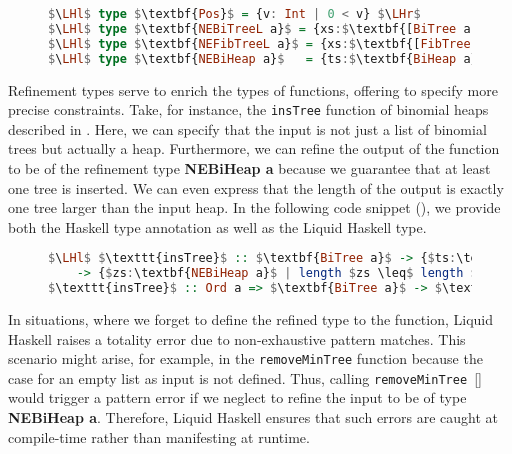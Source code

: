 \documentclass{clmthesis}
\begin{document}
\begin{figure}[h]
\begin{lstlisting}[mathescape=true, language=haskell, caption={Refinement types.},captionpos=b, label=fig:reftypes]
$\LHl$ type $\textbf{Pos}$ = {v: Int | 0 < v} $\LHr$
$\LHl$ type $\textbf{NEBiTreeL a}$ = {xs:$\textbf{[BiTree a]}$ | $\texttt{len}$ xs > 0} $\LHr$
$\LHl$ type $\textbf{NEFibTreeL a}$ = {xs:$\textbf{[FibTree a]}$ | $\texttt{len}$ xs > 0} $\LHr$
$\LHl$ type $\textbf{NEBiHeap a}$	= {ts:$\textbf{BiHeap a}$ | $\texttt{len}$ ts > 0} $\LHr$
\end{lstlisting}
\end{figure}
Refinement types serve to enrich the types of functions, offering to specify more precise constraints. Take, for instance, the \texttt{insTree} function of binomial heaps described in . Here, we can specify that the input is not just a list of binomial trees but actually a heap. Furthermore, we can refine the output of the function to be of the refinement type \textbf{NEBiHeap a} because we guarantee that at least one tree is inserted. We can even express that the length of the output is exactly one tree larger than the input heap. In the following code snippet (), we provide both the Haskell type annotation as well as the Liquid Haskell type.

\begin{figure}[h]
\begin{lstlisting}[mathescape=true, language=haskell, caption={Refinement \texttt{insTree}.},captionpos=b, label=fig:refinsTree]
$\LHl$ $\texttt{insTree}$ :: $\textbf{BiTree a}$ -> {$ts:\textbf{BiHeap a}$} 
	-> {$zs:\textbf{NEBiHeap a}$ | length $zs \leq$ length $ts + 1$} $\LHr$
$\texttt{insTree}$ :: Ord a => $\textbf{BiTree a}$ -> $\textbf{[BiTree a]}$ -> $\textbf{[BiTree a]}$
\end{lstlisting}
\end{figure}

In situations, where we forget to define the refined type to the function, Liquid Haskell raises a totality error due to non-exhaustive pattern matches. This scenario might arise, for example, in the \texttt{removeMinTree} function because the case for an empty list as input is not defined. Thus, calling \texttt{removeMinTree }[] would trigger a pattern error if we neglect to refine the input to be of type \textbf{NEBiHeap a}. Therefore, Liquid Haskell ensures that such errors are caught at compile-time rather than manifesting at runtime.
\end{document}

